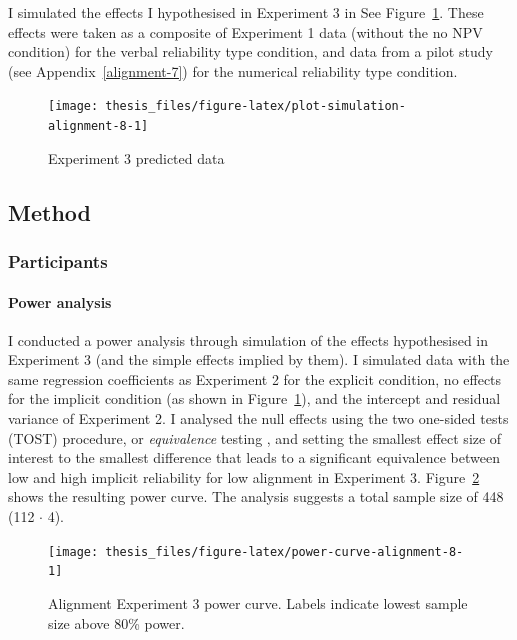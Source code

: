 \documentclass[a4paper, nobind, dvipsnames]{templates/ociamthesis}
\theoremstyle{definition}
\theoremstyle{definition}
\theoremstyle{definition}
\theoremstyle{definition}
\theoremstyle{remark}
\begin{document}
I simulated the effects I hypothesised in Experiment 3 in See
Figure~\ref{fig:plot-simulation-alignment-8}. These effects were taken as a
composite of Experiment 1 data (without the no NPV condition) for the verbal
reliability type condition, and data from a pilot study (see
Appendix~\ref{alignment-7}) for the numerical reliability type condition.



\begin{figure}
\texttt{[image: thesis\_files/figure-latex/plot-simulation-alignment-8-1]} \caption{Experiment 3 predicted data}\label{fig:plot-simulation-alignment-8}
\end{figure}

\hypertarget{method-12}{%
\subsection{Method}\label{method-12}}

\hypertarget{participants-9}{%
\subsubsection{Participants}\label{participants-9}}

\hypertarget{power-analysis-alignment-8}{%
\paragraph{Power analysis}\label{power-analysis-alignment-8}}

I conducted a power analysis through simulation of the effects hypothesised in
Experiment 3 (and the simple effects implied by them). I simulated
data with the same regression coefficients as Experiment 2 for the explicit
condition, no effects for the implicit condition (as shown in
Figure~\ref{fig:plot-simulation-alignment-8}), and the intercept and residual
variance of Experiment 2. I analysed the null effects using the two one-sided
tests (TOST) procedure, or \emph{equivalence} testing \autocite{lakens2018}, and setting the
smallest effect size of interest to the smallest difference that leads to a
significant equivalence between low and high implicit reliability for low
alignment in Experiment 3. Figure~\ref{fig:power-curve-alignment-8} shows the
resulting power curve. The analysis suggests a total sample size of
448 (112 \(\cdot\) 4).

\newpage

\begin{landscape}



\begin{figure}
\texttt{[image: thesis\_files/figure-latex/power-curve-alignment-8-1]} \caption{Alignment Experiment 3 power curve. Labels indicate lowest sample size above 80\% power.}\label{fig:power-curve-alignment-8}
\end{figure}

\end{landscape}
\end{document}
